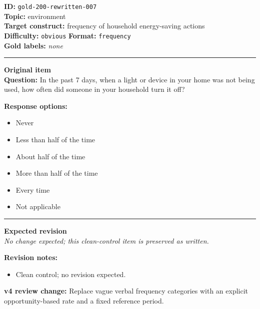 \documentclass[10pt,a4paper]{article}
\newcommand{\sectionline}{\vspace{0.15em}\hrule\vspace{0.35em}}
\begin{document}
\begin{tcolorbox}[colframe=CleanGreen,colback=white,colbacktitle=CleanGreen!9,coltitle=black,title={Item 007\hfill Clean control}]
\textbf{ID:} \texttt{gold-200-rewritten-007}\\
\textbf{Topic:} environment\\
\textbf{Target construct:} frequency of household energy-saving actions\\
\textbf{Difficulty:} \texttt{obvious} \quad \textbf{Format:} \texttt{frequency}\\
\textbf{Gold labels:} \textit{none}\\
\sectionline
\textbf{Original item}\\
\textbf{Question:} In the past 7 days, when a light or device in your home was not being used, how often did someone in your household turn it off?
\par\textbf{Response options:}
\begin{itemize}
\item Never
\item Less than half of the time
\item About half of the time
\item More than half of the time
\item Every time
\item Not applicable
\end{itemize}
\sectionline
\textbf{Expected revision}\\
\textit{No change expected; this clean-control item is preserved as written.}
\par\textbf{Revision notes:}
\begin{itemize}
\item Clean control; no revision expected.
\end{itemize}
\par\textbf{v4 review change:} Replace vague verbal frequency categories with an explicit opportunity-based rate and a fixed reference period.
\end{tcolorbox}
\end{document}
